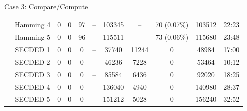 \begin{frame}[noframenumbering]{Case 3: Compare/Compute}
\begin{table}[H]
\begin{tabular}{@{}ccccccccccc@{}}
                                                               & Hamming 4     & 0     & 0           & 97    & --          & \num{103345 }                            & --                                      & 70  {\tiny (0.07\%)}                                 & \num{103512}  & 22:23                                   \\
                                                               & Hamming 5     & 0     & 0           & 96    & --          & \num{115511 }                            & --                                      & 73  {\tiny (0.06\%)}                                 & \num{115680}  & 23:48                                   \\
                                                               & SECDED 1      & 0     & 0           & 0     & --          & \num{37740  }                            & \num{11244}                             & 0                                                    & \num{48984 }  & 17:00                                   \\
                                                               & SECDED 2      & 0     & 0           & 0     & --          & \num{46236  }                            & \num{7228}                              & 0                                                    & \num{53464 }  & 10:12                                   \\
                                                               & SECDED 3      & 0     & 0           & 0     & --          & \num{85584  }                            & \num{6436}                              & 0                                                    & \num{92020 }  & 18:25                                   \\
                                                               & SECDED 4      & 0     & 0           & 0     & --          & \num{136040 }                            & \num{4940}                              & 0                                                    & \num{140980}  & 28:37                                   \\
                                                               & SECDED 5      & 0     & 0           & 0     & --          & \num{151212 }                            & \num{5028}                              & 0                                                    & \num{156240}  & 32:52                                   \\
            \bottomrule
        \end{tabular}
    \end{table}
\end{frame}

